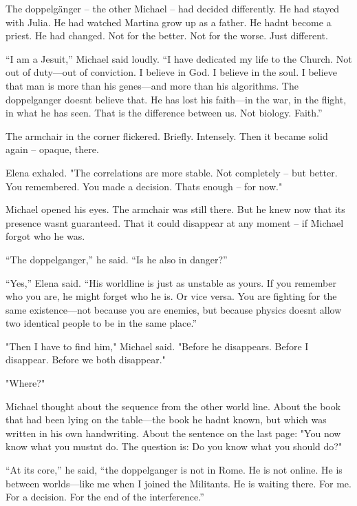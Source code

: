 \documentclass[
]{article}
\begin{document}
The doppelgänger -- the other Michael -- had decided differently. He had stayed with Julia. He had watched Martina grow up as a father. He hadn\textquotesingle t become a priest. He had changed. Not for the better. Not for the worse. Just different.

``I am a Jesuit,'' Michael said loudly. ``I have dedicated my life to the Church. Not out of duty---out of conviction. I believe in God. I believe in the soul. I believe that man is more than his genes---and more than his algorithms. The doppelganger doesn\textquotesingle t believe that. He has lost his faith---in the war, in the flight, in what he has seen. That is the difference between us. Not biology. Faith.''

The armchair in the corner flickered. Briefly. Intensely. Then it became solid again -- opaque, there.

Elena exhaled. "The correlations are more stable. Not completely -- but better. You remembered. You made a decision. That\textquotesingle s enough -- for now."

Michael opened his eyes. The armchair was still there. But he knew now that its presence wasn\textquotesingle t guaranteed. That it could disappear at any moment -- \hspace{0pt}\hspace{0pt}if Michael forgot who he was.

``The doppelganger,'' he said. ``Is he also in danger?''

``Yes,'' Elena said. ``His worldline is just as unstable as yours. If you remember who you are, he might forget who he is. Or vice versa. You are fighting for the same existence---not because you are enemies, but because physics doesn\textquotesingle t allow two identical people to be in the same place.''

"Then I have to find him," Michael said. "Before he disappears. Before I disappear. Before we both disappear."

"Where?"

Michael thought about the sequence from the other world line. About the book that had been lying on the table---the book he hadn\textquotesingle t known, but which was written in his own handwriting. About the sentence on the last page: "You now know what you mustn\textquotesingle t do. The question is: Do you know what you should do?"

``At its core,'' he said, ``the doppelganger is not in Rome. He is not online. He is between worlds---like me when I joined the Militants. He is waiting there. For me. For a decision. For the end of the interference.''
\end{document}
